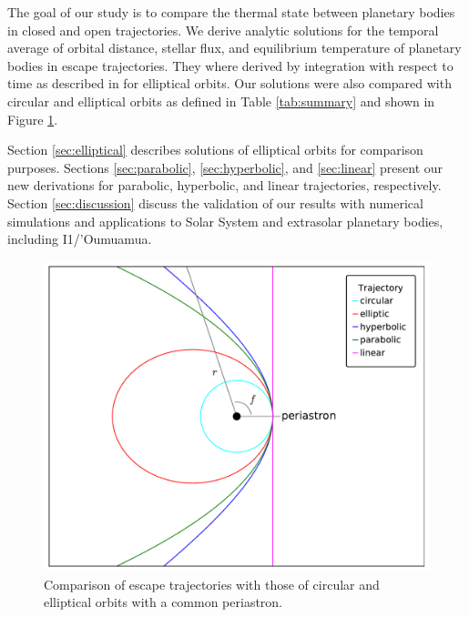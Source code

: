 \documentclass[a4paper,fleqn,usenatbib]{mnras}
\begin{document}

The goal of our study is to compare the thermal state between planetary bodies in closed and open trajectories. We derive analytic solutions for the temporal average of orbital distance, stellar flux, and equilibrium temperature of planetary bodies in escape trajectories. They where derived by integration with respect to time as described in \citet{2017ApJ...837L...1M} for elliptical orbits. Our solutions were also compared with circular and elliptical orbits as defined in Table \ref{tab:summary} and shown in Figure \ref{fig1}. 


Section \ref{sec:elliptical} describes solutions of elliptical orbits for comparison purposes. Sections \ref{sec:parabolic}, \ref{sec:hyperbolic}, and \ref{sec:linear} present our new derivations for parabolic, hyperbolic, and linear trajectories, respectively. Section \ref{sec:discussion} discuss the validation of our results with numerical simulations and applications to Solar System and extrasolar planetary bodies, including I1/'Oumuamua.


\begin{figure}
\includegraphics[width=\columnwidth]{f1.pdf}
\caption{Comparison of escape trajectories with those of circular and elliptical orbits with a common periastron.}
\label{fig1}
\end{figure}

\end{document}
